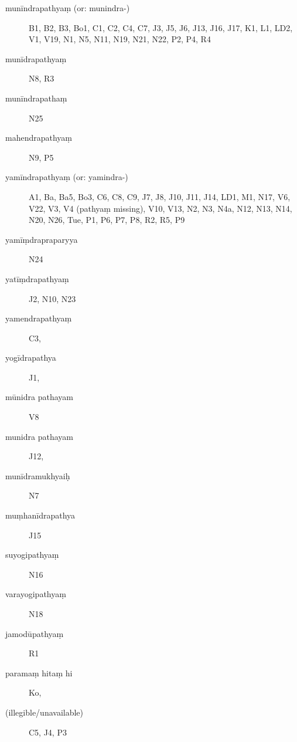\begin{ekdosis}
\begin{marma}[hp01_055]
\begin{marma}[hp01_062]
 \begin{description}
 \item[munīndrapathyaṃ (or: munindra-)] B1, B2, B3, Bo1, C1, C2, C4, C7, J3, J5, J6, J13, J16, J17, K1, L1, LD2, V1, V19, N1, N5, N11, N19, N21, N22, P2, P4, R4
\item[munīdrapathyaṃ]   N8, R3
\item[munīndrapathaṃ]   N25
\item[mahendrapathyaṃ]  N9, P5
 \item[yamīndrapathyaṃ (or: yamindra-)] A1, Ba, Ba5, Bo3, C6, C8, C9, J7, J8, J10, J11, J14, LD1, M1, N17, V6, V22, V3, V4 (pathyaṃ missing), V10, V13, N2, N3, N4a, N12, N13, N14, N20, N26, Tue, P1, P6, P7, P8, R2, R5, P9
\item[yamīṃdrapraparyya]   N24
\item[yatīṃdrapathyaṃ]        J2, N10, N23
\item[yamendrapathyaṃ]        C3,
\item[yogīdrapathya]        J1,         
\item[mūnidra pathayam]        V8
\item[munidra pathayam]        J12,
\item[munīdramukhyaiḥ]        N7
\item[muṃhanīdrapathya]        J15
\item[suyogipathyaṃ]         N16
\item[varayogipathyaṃ]        N18
\item[jamodūpathyaṃ]        R1
\item[paramaṃ hitaṃ hi]        Ko,
\item[(illegible/unavailable)]   C5, J4, P3
        \end{description}
\end{marma}



\end{marma}
\end{ekdosis}

